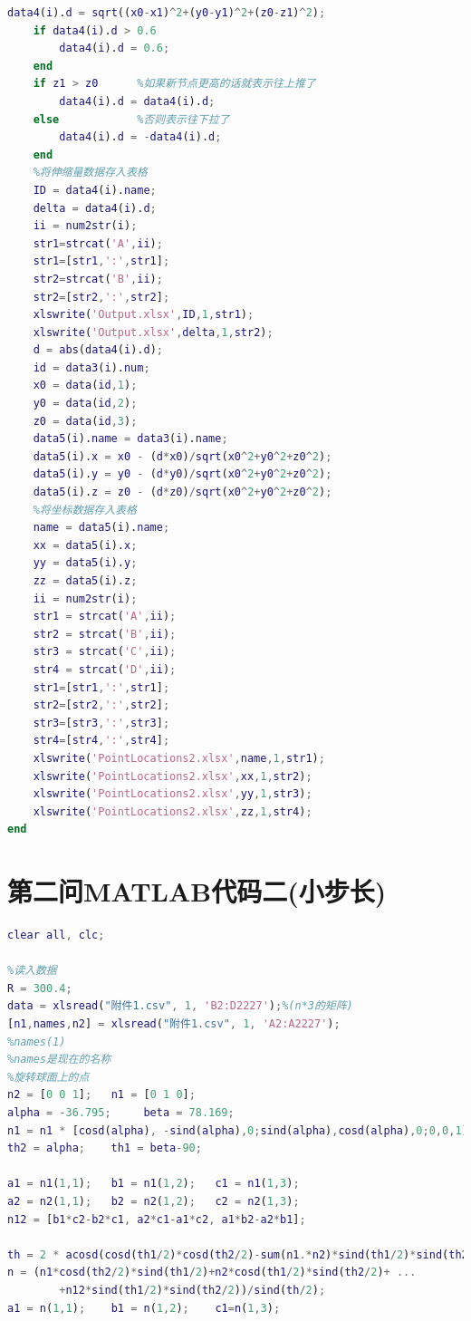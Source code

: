 \documentclass[withoutpreface,bwprint]{cumcmthesis} %
\begin{document}
\begin{appendices}
\begin{lstlisting}[language=matlab]
    data4(i).d = sqrt((x0-x1)^2+(y0-y1)^2+(z0-z1)^2);
    if data4(i).d > 0.6
        data4(i).d = 0.6;
    end
    if z1 > z0      %如果新节点更高的话就表示往上推了
        data4(i).d = data4(i).d;
    else            %否则表示往下拉了
        data4(i).d = -data4(i).d;
    end
    %将伸缩量数据存入表格
    ID = data4(i).name;
    delta = data4(i).d;
    ii = num2str(i);
    str1=strcat('A',ii);
    str1=[str1,':',str1];
    str2=strcat('B',ii);
    str2=[str2,':',str2];
    xlswrite('Output.xlsx',ID,1,str1);
    xlswrite('Output.xlsx',delta,1,str2);
    d = abs(data4(i).d);
    id = data3(i).num;
    x0 = data(id,1);
    y0 = data(id,2);
    z0 = data(id,3);
    data5(i).name = data3(i).name;
    data5(i).x = x0 - (d*x0)/sqrt(x0^2+y0^2+z0^2);
    data5(i).y = y0 - (d*y0)/sqrt(x0^2+y0^2+z0^2);
    data5(i).z = z0 - (d*z0)/sqrt(x0^2+y0^2+z0^2);
    %将坐标数据存入表格
    name = data5(i).name;
    xx = data5(i).x;
    yy = data5(i).y;
    zz = data5(i).z;
    ii = num2str(i);
    str1 = strcat('A',ii);
    str2 = strcat('B',ii);
    str3 = strcat('C',ii);
    str4 = strcat('D',ii);
    str1=[str1,':',str1];
    str2=[str2,':',str2];
    str3=[str3,':',str3];
    str4=[str4,':',str4];
    xlswrite('PointLocations2.xlsx',name,1,str1);
    xlswrite('PointLocations2.xlsx',xx,1,str2);
    xlswrite('PointLocations2.xlsx',yy,1,str3);
    xlswrite('PointLocations2.xlsx',zz,1,str4);
end

\end{lstlisting}
\section{第二问MATLAB代码二(小步长)}
\begin{lstlisting}[language=matlab]
clear all, clc;

%读入数据
R = 300.4;
data = xlsread("附件1.csv", 1, 'B2:D2227');%(n*3的矩阵)
[n1,names,n2] = xlsread("附件1.csv", 1, 'A2:A2227');
%names(1)
%names是现在的名称
%旋转球面上的点
n2 = [0 0 1];   n1 = [0 1 0];   
alpha = -36.795;     beta = 78.169;
n1 = n1 * [cosd(alpha), -sind(alpha),0;sind(alpha),cosd(alpha),0;0,0,1];
th2 = alpha;    th1 = beta-90;

a1 = n1(1,1);   b1 = n1(1,2);   c1 = n1(1,3);
a2 = n2(1,1);   b2 = n2(1,2);   c2 = n2(1,3);
n12 = [b1*c2-b2*c1, a2*c1-a1*c2, a1*b2-a2*b1];

th = 2 * acosd(cosd(th1/2)*cosd(th2/2)-sum(n1.*n2)*sind(th1/2)*sind(th2/2));
n = (n1*cosd(th2/2)*sind(th1/2)+n2*cosd(th1/2)*sind(th2/2)+ ...
        +n12*sind(th1/2)*sind(th2/2))/sind(th/2);
a1 = n(1,1);    b1 = n(1,2);    c1=n(1,3);


\end{lstlisting}
\end{appendices}
\end{document}
